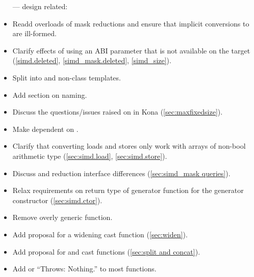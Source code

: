 \begin{itemize}
  \item[---] design related:
  \item Readd \bool overloads of mask reductions and ensure that implicit conversions to \bool are ill-formed.
  \item Clarify effects of using an ABI parameter that is not available on the target (\ref{simd.deleted}, \ref{simd_mask.deleted}, \ref{simd_size}).
  \item Split \whereexpression into \const and non-\const class templates.
  \item Add section on naming.
  \item Discuss the questions/issues raised on  in Kona (\autoref{sec:maxfixedsize}).
  \item Make  dependent on .
  \item Clarify that converting loads and stores only work with arrays of non-bool arithmetic type (\ref{sec:simd.load}, \ref{sec:simd.store}).
  \item Discuss \mask and  reduction interface differences (\autoref{sec:simd_mask queries}).
  \item Relax requirements on return type of generator function for the generator constructor (\ref{sec:simd.ctor}).
  \item Remove overly generic  function.
  \item Add proposal for a widening cast function (\autoref{sec:widen}).
  \item Add proposal for  and  cast functions (\autoref{sec:split and concat}).
  \item Add  or “Throws: Nothing.” to most functions.


\end{itemize}
